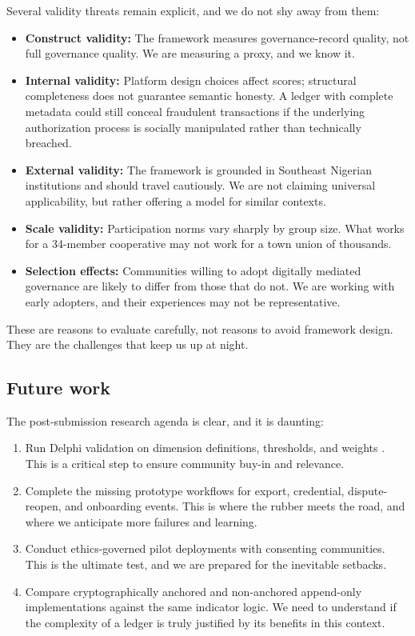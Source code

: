 \documentclass[review,onecolumn]{elsarticle}
\begin{document}
Several validity threats remain explicit, and we do not shy away from them:

\begin{itemize}
\item \textbf{Construct validity:} The framework measures governance-record quality, not full governance quality. We are measuring a proxy, and we know it.
\item \textbf{Internal validity:} Platform design choices affect scores; structural completeness does not guarantee semantic honesty. A ledger with complete metadata could still conceal fraudulent transactions if the underlying authorization process is socially manipulated rather than technically breached.
\item \textbf{External validity:} The framework is grounded in Southeast Nigerian institutions and should travel cautiously. We are not claiming universal applicability, but rather offering a model for similar contexts.
\item \textbf{Scale validity:} Participation norms vary sharply by group size. What works for a 34-member cooperative may not work for a town union of thousands.
\item \textbf{Selection effects:} Communities willing to adopt digitally mediated governance are likely to differ from those that do not. We are working with early adopters, and their experiences may not be representative.
\end{itemize}

These are reasons to evaluate carefully, not reasons to avoid framework design. They are the challenges that keep us up at night.

\subsection{Future work}

The post-submission research agenda is clear, and it is daunting:

\begin{enumerate}
\item Run Delphi validation on dimension definitions, thresholds, and weights \cite{rowe1999}. This is a critical step to ensure community buy-in and relevance.
\item Complete the missing prototype workflows for export, credential, dispute-reopen, and onboarding events. This is where the rubber meets the road, and where we anticipate more failures and learning.
\item Conduct ethics-governed pilot deployments with consenting communities. This is the ultimate test, and we are prepared for the inevitable setbacks.
\item Compare cryptographically anchored and non-anchored append-only implementations against the same indicator logic. We need to understand if the complexity of a ledger is truly justified by its benefits in this context.
\end{enumerate}
\end{document}
